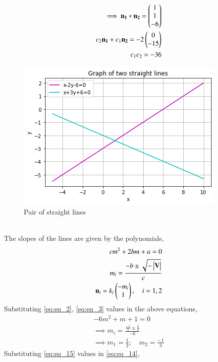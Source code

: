 \documentclass[journal,12pt,twocolumn]{IEEEtran}
\begin{document}
\begin{align}
    \implies \mathbf{n_1} * \mathbf{n_2} = \begin{pmatrix}1 \\ 1 \\ -6\end{pmatrix} \label{eq:eq_10} \\
    c_2\mathbf{n_1}+c_1\mathbf{n_2} = -2\begin{pmatrix}0 \\ -15\end{pmatrix} \label{eq:eq_11} \\
    c_1c_2 = -36 \label{eq:eq_12}
\end{align}
\renewcommand{\thefigure}{1}
\begin{figure}[h!]
    \centering
    \includegraphics[width=\columnwidth]{Assignment_6_Plot.png}
    \caption{Pair of straight lines}
    \label{Fig:1}
\end{figure} \\
The slopes of the lines are given by the polynomials,
\begin{align}
    cm^2+2bm+a=0 \nonumber \\
    m_i = \frac{-b\pm \sqrt{-\begin{vmatrix}\mathbf{V}\end{vmatrix}}}{c} \label{eq:eq_13} \\
    \mathbf{n}_i = k_i\begin{pmatrix}-m_i \\ 1\end{pmatrix}, \quad i=1,2 \label{eq:eq_14}
\end{align}
Substituting \eqref{eq:eq_2}, \eqref{eq:eq_3} values in the above equations,
\begin{align}
    -6m^2+m+1=0 \nonumber \\
    \implies m_i = \frac{\frac{-1}{2}\pm \frac{5}{2}}{-6} \nonumber \\
    \implies m_1 = \frac{1}{2}; \quad m_2 = \frac{-1}{3} \label{eq:eq_15}
\end{align}
Substituting \eqref{eq:eq_15} values in \eqref{eq:eq_14},
\end{document}
